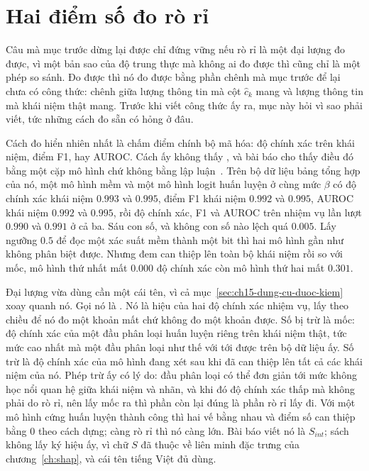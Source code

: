 \section{Hai điểm số đo rò rỉ}
\label{sec:ch15-do-ro-ri}

%
Câu mà mục trước dừng lại được chỉ đứng vững nếu rò rỉ là một đại lượng đo được,
vì một bản sao của độ trung thực mà không ai đo được thì cũng chỉ là một phép so
sánh. Đo được thì nó đo được bằng phần chênh mà mục trước để lại chưa có công
thức: chênh giữa lượng thông tin mà cột $\hat c_k$ mang và lượng thông tin mà
khái niệm thật mang. Trước khi viết công thức ấy ra, mục này hỏi vì sao phải
viết, tức những cách đo sẵn có hỏng ở đâu.

%
Cách đo hiển nhiên nhất là chấm điểm chính bộ mã hóa: độ chính xác trên khái
niệm, điểm F1, hay AUROC. Cách ấy không thấy , và bài báo cho
thấy điều đó bằng một cặp mô hình chứ không bằng lập luận~\autocite{p30leakage}.
Trên bộ dữ
liệu bảng tổng hợp của nó, một mô hình mềm và một mô hình logit huấn luyện ở
cùng mức $\beta$ có độ chính xác khái niệm $0.993$ và $0.995$, điểm F1 khái niệm
$0.992$ và $0.995$, AUROC khái niệm $0.992$ và $0.995$, rồi độ chính xác, F1 và
AUROC trên nhiệm vụ lần lượt $0.990$ và $0.991$ ở cả ba. Sáu con số, và không
con số nào lệch quá $0.005$. Lấy ngưỡng $0.5$ để đọc một xác suất mềm thành một bit
thì hai mô hình gần như không phân biệt được. Nhưng đem can thiệp lên toàn bộ
khái niệm rồi so với mốc, mô hình thứ nhất mất $0.000$ độ chính xác còn mô hình
thứ hai mất $0.301$.

%
Đại lượng vừa dùng cần một cái tên, vì cả mục~\ref{sec:ch15-dung-cu-duoc-kiem}
xoay quanh nó. Gọi nó là . Nó là hiệu
của hai độ chính xác nhiệm vụ, lấy theo chiều để nó đo một khoản mất chứ không
đo một khoản được. Số bị trừ là mốc: độ chính xác của một đầu phân loại huấn
luyện riêng trên khái niệm thật, tức mức cao nhất mà một đầu phân loại như thế
với tới được trên bộ dữ liệu ấy. Số trừ là độ chính xác của mô hình đang xét sau
khi đã can thiệp lên tất cả các khái niệm của nó. Phép trừ ấy có lý do: đầu phân
loại có thể đơn giản tới mức không học nổi quan hệ giữa khái niệm và nhãn, và
khi đó độ chính xác thấp mà không phải do rò rỉ, nên lấy mốc ra thì phần còn lại
đúng là phần rò rỉ lấy đi. Với một mô hình cứng huấn luyện thành công thì hai vế
bằng nhau và điểm số can thiệp bằng 0 theo cách dựng; càng rò rỉ thì nó càng
lớn. Bài báo viết nó là $S_{int}$; sách không lấy ký hiệu ấy, vì chữ $S$ đã
thuộc về liên minh đặc trưng của chương~\ref{ch:shap}, và cái tên tiếng Việt đủ
dùng.

